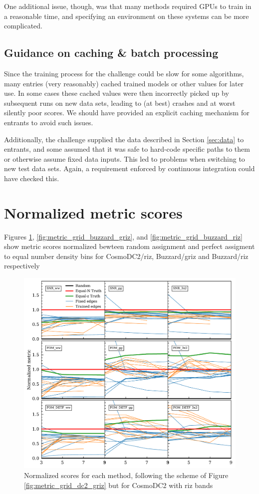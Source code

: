\documentclass[twocolumn,twocolappendix]{aastex63}
\begin{document}
One additional issue, though, was that many methods required GPUs to train in a reasonable time,
and specifying an environment on these systems can be more complicated.

\subsection{Guidance on caching \& batch processing}
Since the training process for the challenge could be slow for some algorithms, many entries
(very reasonably) cached trained models or other values for later use.  In some cases these
cached values were then incorrectly picked up by subsequent runs on new data sets, leading
to (at best) crashes and at worst silently poor scores.  We should have provided an explicit
caching mechanism for entrants to avoid such issues.

Additionally, the challenge supplied the data described in Section \ref{sec:data} to entrants,
and some assumed that it was safe to hard-code specific paths to them or
otherwise assume fixed data inputs.  This led to problems when switching to new test data sets. 
Again, a requirement enforced by continuous integration could have checked this.

\section{Normalized metric scores} \label{app:metric_grids}
Figures \ref{fig:metric_grid_dc2_riz}, \ref{fig:metric_grid_buzzard_griz}, and \ref{fig:metric_grid_buzzard_riz} show metric scores normalized bewteen random assignment and perfect assigment to equal number density bins for CosmoDC2/riz, Buzzard/griz and Buzzard/riz respectively

\begin{figure}
\includegraphics[width=1\linewidth]{results/metric_grid_dc2_riz.pdf}
\caption{Normalized scores for each method, following the scheme of Figure \ref{fig:metric_grid_dc2_griz}
but for CosmoDC2 with riz bands}
\label{fig:metric_grid_dc2_riz}
\end{figure}
\end{document}

